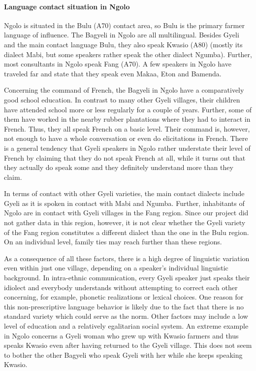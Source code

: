 \paragraph{Language contact situation in Ngolo} Ngolo is situated in the Bulu (A70) contact area, so Bulu is the primary farmer language of influence. The Bagyeli in Ngolo are all multilingual. Besides Gyeli and the main contact language Bulu, they also speak Kwasio (A80) (mostly its dialect Mabi, but some speakers rather speak the other dialect Ngumba). Further, most consultants in Ngolo speak Fang (A70). A few speakers in Ngolo have traveled far and state that they speak even Makaa, Eton and Bamenda. %

Concerning the command of French, the Bagyeli in Ngolo have a comparatively good school education. In contrast to many other Gyeli villages, their children have attended school more or less regularly for a couple of years. Further, some of them have worked in the nearby rubber plantations where they had to interact in French. Thus, they all speak French on a basic level. Their command is, however, not enough to have a whole conversation or even do elicitations in French. There is a general tendency that Gyeli speakers in Ngolo rather understate their level of French by claiming that they do not speak French at all, while it turns out that they actually do speak some and they definitely understand more than they claim. 

In terms of contact with other Gyeli varieties, the main contact dialects include Gyeli as it is spoken in contact with Mabi and Ngumba. Further, inhabitants of Ngolo are in contact with Gyeli villages in the Fang region. Since our project did not gather data in this region, however, it is not clear whether the Gyeli variety of the Fang region constitutes a different dialect than the one in the Bulu region. On an individual level, family ties may reach further than these regions. 

As a consequence of all these factors, there is a high degree of linguistic variation even within just one village, depending on a speaker's individual linguistic background.
In intra-ethnic communication, every Gyeli speaker just speaks their idiolect and everybody understands without attempting to correct each other concerning,  for example,  phonetic realizations or lexical choices. One reason for this non-prescriptive language behavior is likely due to the fact that there is no standard variety which could serve as the norm.  Other factors may include a low level of education and a relatively egalitarian social system. An extreme example in Ngolo concerns a Gyeli woman who grew up with Kwasio farmers and thus speaks Kwasio even after having returned to the Gyeli village. This does not seem to bother the other Bagyeli who speak Gyeli with her while she keeps speaking Kwasio. 


